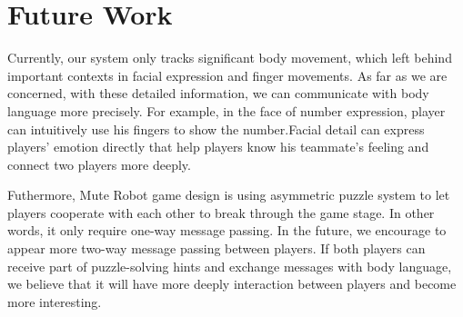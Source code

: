 \documentclass{chi-ext}
\begin{document}




\section{Future Work}

Currently, our system only tracks significant body movement, which left behind important contexts in facial expression and finger movements. As far as we are concerned, with these detailed information, we can communicate with body language more precisely. For example, in the face of number expression, player can intuitively use his fingers to show the number.Facial detail can express players' emotion directly that help players know his teammate's feeling and connect two players more deeply.


Futhermore, Mute Robot game design is using asymmetric puzzle system to let players cooperate with each other to break through the game stage. In other words, it only require one-way message passing.
In the future, we encourage to appear more two-way message passing between players. 
If both players can receive part of puzzle-solving hints and exchange messages with body language, we believe that it will have more deeply interaction between players and become more interesting.

\end{document}

